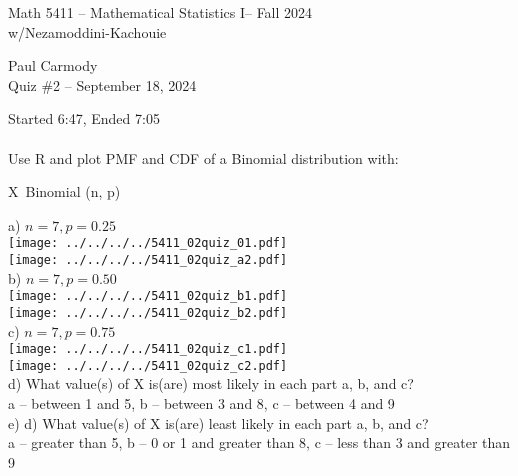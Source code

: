 \documentclass[10pt,a4paper]{report}
\newcommand{\CLASSNAME}{Math 5411 -- Mathematical Statistics I}
\newcommand{\PROFESSOR}{Nezamoddini-Kachouie}
\newcommand{\STUDENTNAME}{Paul Carmody}
\newcommand{\ASSIGNMENT}{Quiz \#2 }
\newcommand{\DUEDATE}{September 18, 2024}
\newcommand{\SEMESTER}{Fall 2024}
\begin{document}
\begin{center}
	\Large{\CLASSNAME -- \SEMESTER} \\
	\large{w/\PROFESSOR}
\end{center}
\begin{center}
	\STUDENTNAME \\
	\ASSIGNMENT -- \DUEDATE\\
\end{center}

Started 6:47, Ended 7:05\\ \\
Use R and plot PMF and CDF of a Binomial distribution with:

X~Binomial (n, p)

a) $n = 7, p = 0.25$\\
\texttt{[image: ../../../../5411\_02quiz\_01.pdf]} \\
\texttt{[image: ../../../../5411\_02quiz\_a2.pdf]} \\
b) $n = 7, p = 0.50$\\
\texttt{[image: ../../../../5411\_02quiz\_b1.pdf]} \\
\texttt{[image: ../../../../5411\_02quiz\_b2.pdf]} \\

c) $n = 7, p = 0.75$\\
\texttt{[image: ../../../../5411\_02quiz\_c1.pdf]} \\
\texttt{[image: ../../../../5411\_02quiz\_c2.pdf]} \\

d) What value(s) of X is(are) most likely in each part a, b, and c?\\
a -- between 1 and 5, b -- between 3 and 8, c -- between 4 and 9 \\

e) d) What value(s) of X is(are) least likely in each part a, b, and c? \\
a -- greater than 5, b -- 0 or 1 and greater than 8, c -- less than 3 and greater than 9
\end{document}
